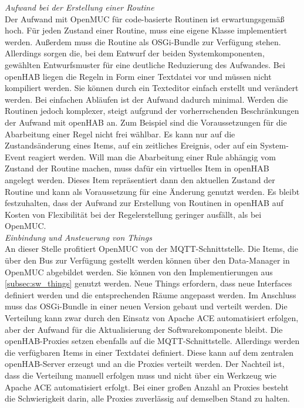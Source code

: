\textit{Aufwand bei der Erstellung einer Routine}\\
Der Aufwand mit OpenMUC für code-basierte Routinen ist erwartungsgemäß hoch.
Für jeden Zustand einer Routine, muss eine eigene Klasse implementiert werden.
Außerdem muss die Routine als \ac{OSGi}-Bundle zur Verfügung stehen.
Allerdings sorgen die, bei dem Entwurf der beiden Systemkomponenten, gewählten Entwurfsmuster für eine deutliche Reduzierung des Aufwandes. 
Bei openHAB liegen die Regeln in Form einer Textdatei vor und müssen nicht kompiliert werden. 
Sie können durch ein Texteditor einfach erstellt und verändert werden.
Bei einfachen Abläufen ist der Aufwand dadurch minimal.
Werden die Routinen jedoch komplexer, steigt aufgrund der vorherrschenden Beschränkungen der Aufwand mit openHAB an.
Zum Beispiel sind die Voraussetzungen für die Abarbeitung einer Regel nicht frei wählbar. 
Es kann nur auf die Zustandsänderung eines Items, auf ein zeitliches Ereignis, oder auf ein System-Event reagiert werden.
Will man die Abarbeitung einer Rule abhängig vom Zustand der Routine machen, muss dafür ein virtuelles Item in openHAB angelegt werden.
Dieses Item repräsentiert dann den aktuellen Zustand der Routine und kann als Voraussetzung für eine Änderung genutzt werden.
Es bleibt festzuhalten, dass der Aufwand zur Erstellung von Routinen in openHAB auf Kosten von Flexibilität bei der 
Regelerstellung geringer ausfällt, als bei OpenMUC.\\

\textit{Einbindung und Ansteuerung von Things}\\
An dieser Stelle profitiert OpenMUC von der \ac{MQTT}-Schnittstelle.
Die Items, die über den Bus zur Verfügung gestellt werden können über den Data-Manager in OpenMUC abgebildet werden.
Sie können von den Implementierungen aus \autoref{subsec:sw_things} genutzt werden.
Neue Things erfordern, dass neue Interfaces definiert werden und die entsprechenden Räume angepasst werden.
Im Anschluss muss das \ac{OSGi}-Bundle in einer neuen Version gebaut und verteilt werden.
Die Verteilung kann zwar durch den Einsatz von Apache ACE automatisiert erfolgen, aber der Aufwand für die Aktualisierung der Softwarekomponente bleibt.
Die openHAB-Proxies setzen ebenfalls auf die \ac{MQTT}-Schnittstelle. Allerdings werden die verfügbaren Items in einer Textdatei definiert. 
Diese kann auf dem zentralen openHAB-Server erzeugt und an die Proxies verteilt werden.
Der Nachteil ist, dass die Verteilung manuell erfolgen muss und nicht über ein Werkzeug wie Apache ACE automatisiert erfolgt. 
Bei einer großen Anzahl an Proxies besteht die Schwierigkeit darin, alle Proxies zuverlässig auf demselben Stand zu halten.\\


